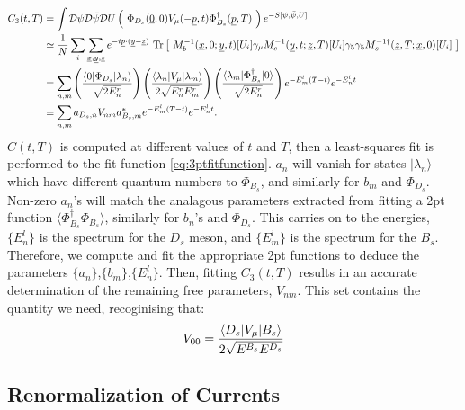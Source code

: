 \documentclass[a4paper,10pt]{article}
\numberwithin{equation}{section}
\begin{document}
\begin{align}
	C_3(t,T) &= \int \mathcal{D}\psi \mathcal{D}\bar{\psi} \mathcal{D}U \left(\text{ } \Phi_{D_s}(\underline{0},0) V_{\mu}(-\underline{p},t) \Phi_{B_s}^{\dagger}(\underline{p},T) \text{ }\right) e^{-S[\psi,\bar{\psi},U]} \\
	&\simeq {1\over N} \sum_i \sum_{\underline{x},\underline{y},\underline{z}} e^{-i\underline{p}\cdot (\underline{y}-\underline{z})} \text{ Tr}\left[\text{ } M^{-1}_b(\underline{x},0;\underline{y},t)[U_i] \gamma_{\mu} M^{-1}_c(\underline{y},t;\underline{z},T)[U_i]\gamma_5\gamma_5 M_s^{-1\dagger}(\underline{z},T;\underline{x},0)[U_i]  \text{ }\right] \\	
	&= \sum_{n,m}  \left( {\langle 0 | \Phi_{D_s} | \lambda_n \rangle \over \sqrt{2E^r_n}} \right) \left({\langle \lambda_n | V_{\mu} | \lambda_m \rangle \over 2\sqrt{ E^r_n E^r_m } }\right) \left( {\langle \lambda_m | \Phi_{B_s}^{\dagger} | 0 \rangle \over \sqrt{2E^r_n} } \right) e^{-E^l_m (T-t)} e^{-E^l_n t} \\
	\nonumber
	& \equiv \sum_{n,m} a_{D_s,n} V_{nm} a^*_{B_s,m} e^{-E^l_m (T-t)} e^{-E^l_n t}.
	\label{eq:3ptfitfunction}
\end{align}
$C(t,T)$ is computed at different values of $t$ and $T$, then a least-squares fit is performed to the fit function \eqref{eq:3ptfitfunction}. $a_n$ will vanish for states $|\lambda_n\rangle$ which have different quantum numbers to $\Phi_{B_s}$, and similarly for $b_m$ and $\Phi_{D_s}$. Non-zero $a_n$'s will match the analagous parameters extracted from fitting a 2pt function $\langle \Phi_{B_s}^{\dagger} \Phi_{B_s} \rangle$, similarly for $b_n$'s and $\Phi_{D_s}$. This carries on to the energies, $\{E^l_n\}$ is the spectrum for the $D_s$ meson, and $\{E^l_m\}$ is the spectrum for the $B_s$. Therefore, we compute and fit the appropriate 2pt functions to deduce the parameters $\{a_n\}$,$\{b_m\}$,$\{E^l_n\}$. Then, fitting $C_3(t,T)$ results in an accurate determination of the remaining free parameters, $V_{nm}$. This set contains the quantity we need, recoginising that:
\begin{align}
	V_{00} = {\langle D_s | V_{\mu} | B_s \rangle \over 2\sqrt{E^{B_s} E^{D_s} } }
\end{align}

\subsection{Renormalization of Currents}
\label{sec:renormalization}
\end{document}
